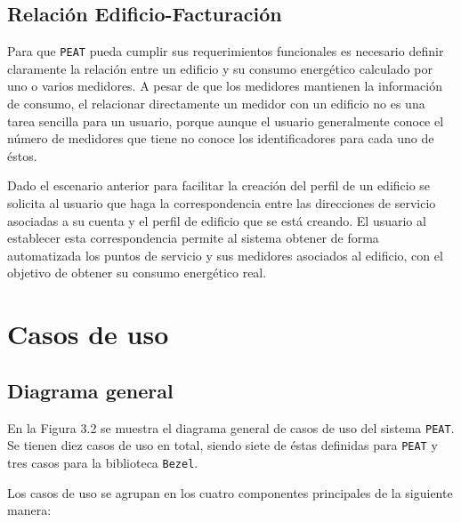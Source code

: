 \subsection{Relación Edificio-Facturación}

Para que \texttt{PEAT} pueda cumplir sus requerimientos funcionales es necesario
definir claramente la relación entre un edificio y su consumo energético calculado
por uno o varios medidores.
A pesar de que los medidores mantienen la información de consumo, el relacionar
directamente un medidor con un edificio no es una tarea sencilla para un usuario,
porque aunque el usuario generalmente conoce el número de medidores que tiene no
conoce los identificadores para cada uno de éstos.

Dado el escenario anterior para facilitar la creación del perfil de un edificio se
solicita al usuario que haga la correspondencia entre las direcciones de servicio
asociadas a su cuenta y el perfil de edificio que se está creando.
El usuario al establecer esta correspondencia permite al sistema obtener de forma
automatizada los puntos de servicio y sus medidores asociados al edificio, con el
objetivo de obtener su consumo energético real.

\section{Casos de uso}

\subsection{Diagrama general}

En la Figura 3.2 se muestra el diagrama general de casos de uso del sistema
\texttt{PEAT}. Se tienen diez casos de uso en total, siendo siete de éstas definidas
para \texttt{PEAT} y tres casos para la biblioteca \texttt{Bezel}.

Los casos de uso se agrupan en los cuatro componentes principales de la
siguiente manera:

